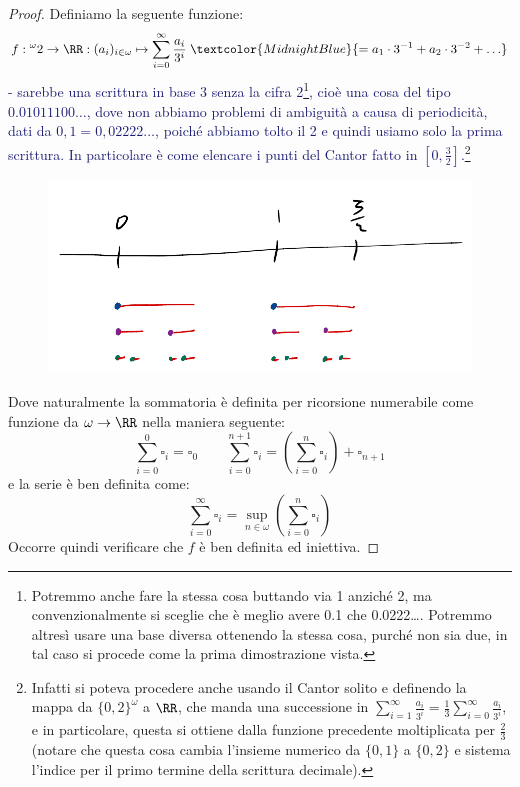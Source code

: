 \begin{proof}
	Definiamo la seguente funzione:
	\[ f : {}^{\omega}2 \to \RR : (a_i)_{i \in \omega} \mapsto \sum_{i = 0}^{\infty} \frac{a_i}{3^i} \;\textcolor{MidnightBlue}{= a_1 \cdot 3^{-1} + a_2 \cdot 3^{-2} + \ldots}
		\]
	\textcolor{MidnightBlue}{- sarebbe una scrittura in base 3 senza la cifra 2\footnote{Potremmo anche fare la stessa cosa buttando
	via 1 anziché 2, ma convenzionalmente si sceglie che è meglio avere 0.1 che 0.0222\ldots. Potremmo altresì usare una base diversa ottenendo la stessa cosa, purché non sia due, in tal caso si procede come la prima dimostrazione vista.}, cioè una cosa del tipo $0.01011100\ldots$,
	dove non abbiamo problemi di ambiguità a causa di periodicità, dati da $0,1 = 0,02222\ldots$, poiché abbiamo tolto il 2 e quindi usiamo solo la prima scrittura. In particolare è come elencare i punti del Cantor fatto in $\left[0,\frac{3}{2}\right]$.}\footnote{Infatti si poteva procedere anche usando il Cantor solito e definendo la mappa da $\{0,2\}^\omega$ a $\RR$,
	che manda una successione in $\sum_{i = 1}^\infty \frac{a_i}{3^i} = \frac 13 \sum_{i = 0}^\infty \frac{a_i}{3^i}$, e in particolare, questa si ottiene dalla funzione precedente moltiplicata per $\frac{2}{3}$ (notare che questa cosa cambia l'insieme numerico da $\{0,1\}$ a $\{0,2\}$ e sistema l'indice per il primo termine della scrittura decimale).}
	\begin{figure}[H]
		\centering
		\includegraphics[scale = 0.4]{immagini/cantor_0_32.png}
	\end{figure}
	Dove naturalmente la sommatoria è definita per ricorsione numerabile come funzione da $\omega \to \RR$ nella maniera seguente:
	\[ \sum_{i = 0}^0 \square_i = \square_0 \qquad \sum_{i = 0}^{n + 1} \square_i = \left(\sum_{i = 0}^n \square_i\right) + \square_{n + 1}
		\]
	e la serie è ben definita come:
	\[ \sum_{i = 0}^{\infty}\square_i = \sup_{n \in \omega}\left(\sum_{i = 0}^n \square_i\right)
		\]
	Occorre quindi verificare che $f$ è ben definita ed iniettiva.

\end{proof}
